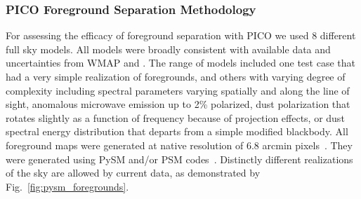\documentclass[PICOReport.tex]{subfiles}
\begin{document}


\subsubsection{PICO Foreground Separation Methodology}

For assessing the efficacy of foreground separation with PICO we used 8 different full sky models. All models were broadly consistent with available data and uncertainties from WMAP and \planck . The range of models included one test case that had a very simple realization of foregrounds, and others with varying degree of complexity including spectral parameters varying spatially and along the line of sight, anomalous microwave emission up to 2\% polarized, dust polarization that rotates slightly as a function of frequency because of projection effects, or dust spectral energy distribution that departs from a simple modified blackbody. All foreground maps were generated at native resolution of 6.8 arcmin pixels~\citep{gorski/etal:2005}. They were generated using PySM and/or PSM codes~\citep{thorne2018_pysm,delabrouille/etal:2013}.   Distinctly different realizations of the sky are allowed by current data, as demonstrated by Fig.~\ref{fig:pysm_foregrounds}. 
\end{document}
